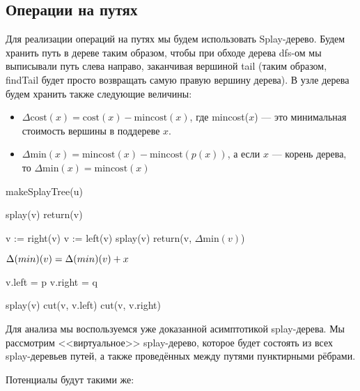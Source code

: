 \subsection{Операции на путях}

Для реализации операций на путях мы будем использовать Splay-дерево. Будем хранить путь в дереве таким образом, чтобы при обходе дерева dfs-ом мы выписывали путь слева направо, заканчивая вершиной tail (таким образом, findTail будет просто возвращать самую правую вершину дерева). В узле дерева будем хранить также следующие величины:

\begin{itemize}
	\item $\Delta \text{cost}(x) = \text{cost}(x) - \text{mincost}(x)$, где mincost($x$) --- это минимальная стоимость вершины в поддереве $x$.
	\item $\Delta \text{min}(x) = \text{mincost}(x) - \text{mincost}(p(x))$, а если $x$ --- корень дерева, то $\Delta \text{min}(x) = \text{mincost}(x)$
\end{itemize}

\begin{algorithmic}[1]
		\State makeSplayTree(u)
	\EndProcedure

		\State splay(v)
		\State return(v)
	\EndProcedure

				\State v := right(v)
			\Else
				\State v := left(v)
			\EndIf
		\EndWhile
		\State splay(v)
		\State return(v, $\Delta \text{min}(v)$)
	\EndProcedure

		\State $\Delta \text(min)(v) = \Delta \text(min)(v) + x$
	\EndProcedure

		\State v.left = p
		\State v.right = q
	\EndProcedure

		\State splay(v)
		\State cut(v, v.left)
		\State cut(v, v.right)
	\EndProcedure

\end{algorithmic}

Для анализа мы воспользуемся уже доказанной асимптотикой splay-дерева. Мы рассмотрим <<виртуальное>> splay-дерево, которое будет состоять из всех splay-деревьев путей, а также проведённых между путями пунктирными рёбрами.

Потенциалы будут такими же:

